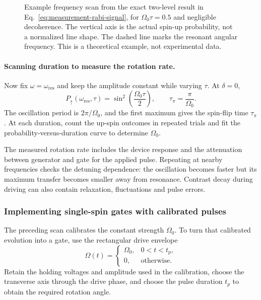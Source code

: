 \begin{figure}[htbp]
 \centering
 
 \caption{Example frequency scan from the exact two-level result
 in Eq.~\eqref{eq:measurement-rabi-signal}, for
 $\Omega_0\tau=0.5$ and negligible decoherence. The vertical axis
 is the actual spin-up probability, not a normalized line shape.
 The dashed line marks the resonant angular frequency. This is a
 theoretical example, not experimental data.}
 \label{fig:calibration-spin-frequency-scan}
\end{figure}

\paragraph{Scanning duration to measure the rotation rate.}
Now fix $\omega=\omega_{\mathrm{res}}$ and keep the amplitude constant
while varying $\tau$. At $\delta=0$,
\begin{equation}
 P_\uparrow(\omega_{\mathrm{res}},\tau)
       =\sin^2\!\left(\frac{\Omega_0\tau}{2}\right),
 \qquad \tau_\pi=\frac{\pi}{\Omega_0}.
 \label{eq:measurement-resonant-rabi}
\end{equation}
The oscillation period is $2\pi/\Omega_0$, and the first maximum
gives the spin-flip time $\tau_\pi$. At each duration, count the up-spin outcomes
in repeated trials and fit the probability-versus-duration curve
to determine $\Omega_0$.

The measured rotation rate includes the device response and the
attenuation between generator and gate for the applied pulse.
Repeating at nearby frequencies checks the detuning dependence:
the oscillation becomes faster but its maximum transfer becomes
smaller away from resonance. Contrast decay during driving can
also contain relaxation, fluctuations and pulse errors.

\subsubsection{Implementing single-spin gates with calibrated pulses}
\label{sec:calibration-spin-rotations}

The preceding scan calibrates the constant strength $\Omega_0$.
To turn that calibrated evolution into a gate, use the rectangular
drive envelope
\[
 \Omega(t)=
 \begin{cases}
  \Omega_0,&0<t<t_p,\\
  0,&\text{otherwise}.
 \end{cases}
\]
Retain the holding voltages and amplitude used in the calibration,
choose the transverse axis through the drive phase, and choose the
pulse duration $t_p$ to obtain the required rotation angle.

